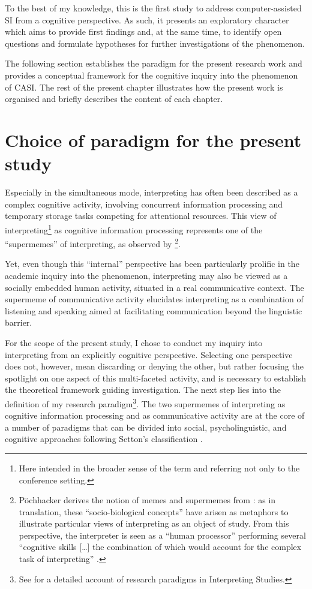 To the best of my knowledge, this is the first study to address com\-put\-er-as\-sist\-ed SI from a cognitive perspective. As such, it presents an exploratory character which aims to provide first findings and, at the same time, to identify open questions and formulate hypotheses for further investigations of the phenomenon.

The following section establishes the paradigm for the present research work and provides a conceptual framework for the cognitive inquiry into the phenomenon of CASI. The rest of the present chapter illustrates how the present work is organised and briefly describes the content of each chapter.


\section*{Choice of paradigm for the present study}\label{paradigm}

Especially in the simultaneous mode, interpreting has often been described as a complex cognitive activity, involving concurrent information processing and temporary storage tasks competing for attentional resources. This view of interpreting\footnote{Here intended in the broader sense of the term and referring not only to the conference setting.} as cognitive information processing represents one of the ``supermemes'' of interpreting, as observed by \citet[51]{pochhacker_introducing_2004}\footnote{Pöchhacker derives the notion of memes and supermemes from \citet{chesterman_memes_2016}: as in translation, these ``socio-biological concepts'' have arisen as metaphors to illustrate particular views of interpreting as an object of study. From this perspective, the interpreter is seen as a ``human processor'' performing several ``cognitive skills […] the combination of which would account for the complex task of interpreting'' \citep[53]{pochhacker_introducing_2004}.}.

Yet, even though this ``internal'' perspective has been particularly prolific in the academic inquiry into the phenomenon, interpreting may also be viewed as a socially embedded human activity, situated in a real communicative context. The supermeme of communicative activity elucidates interpreting as a combination of listening and speaking aimed at facilitating communication beyond the linguistic barrier.

For the scope of the present study, I chose to conduct my inquiry into interpreting from an explicitly cognitive perspective. Selecting one perspective does not, however, mean discarding or denying the other, but rather focusing the spotlight on one aspect of this multi-faceted activity, and is necessary to establish the theoretical framework guiding investigation. The next step lies into the definition of my research paradigm\footnote{See \citet{pochhacker_introducing_2004,pochhacker_introducing_2016} for a detailed account of research paradigms in Interpreting Studies.}. The two supermemes of interpreting as cognitive information processing and as communicative activity are at the core of a number of paradigms that can be divided into social, psycholinguistic, and cognitive approaches following Setton's classification \citep{setton_models_2003}.

